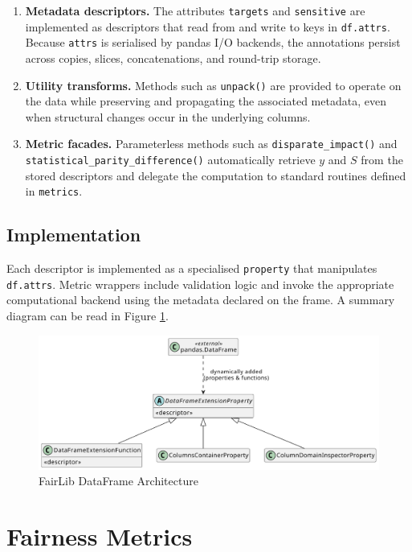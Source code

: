 \documentclass[12pt,a4paper,openright,twoside]{book}
\begin{document}
\begin{enumerate}[label=\alph*)]
  \item \textbf{Metadata descriptors.} The attributes \texttt{targets} and \texttt{sensitive} are implemented as descriptors that read from and write to keys in \texttt{df.attrs}. Because \texttt{attrs} is serialised by pandas I/O backends, the annotations persist across copies, slices, concatenations, and round-trip storage.
  \item \textbf{Utility transforms.} Methods such as \texttt{unpack()} are provided to operate on the data while preserving and propagating the associated metadata, even when structural changes occur in the underlying columns.
  \item \textbf{Metric facades.} Parameterless methods such as \texttt{disparate\_impact()} and \texttt{statistical\_parity\_difference()} automatically retrieve $y$ and $S$ from the stored descriptors and delegate the computation to standard routines defined in \texttt{metrics}.
\end{enumerate}

\subsection{Implementation} Each descriptor is implemented as a specialised \texttt{property} that manipulates \texttt{df.attrs}. Metric wrappers include validation logic and invoke the appropriate computational backend using the metadata declared on the frame. A summary diagram can be read in Figure \ref{fig:df-uml}.

\begin{figure}
\centering
\includegraphics[width=\textwidth]{figures/uml/dataframe.pdf}
\caption{FairLib DataFrame Architecture}
\label{fig:df-uml}
\end{figure}

\section{Fairness Metrics}
\end{document}
